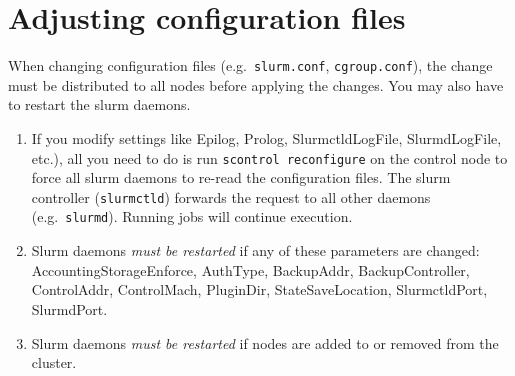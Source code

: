 %
%
%
%
%
%

\section{Adjusting configuration files} \label{sec:slurmconfig}

When changing configuration files (e.g.\ \texttt{slurm.conf}, \texttt{cgroup.conf}), the change must be distributed to all nodes before applying the changes. You may also have to restart the slurm daemons.

\begin{enumerate}
\item If you modify settings like Epilog, Prolog, SlurmctldLogFile, SlurmdLogFile, etc.), all you need to do is run \texttt{scontrol reconfigure} on the control node to force all slurm daemons to re-read the configuration files. The slurm controller (\texttt{slurmctld}) forwards the request to all other daemons (e.g.\ \texttt{slurmd}). Running jobs will continue execution. 
\item Slurm daemons \emph{must be restarted} if any of these parameters are changed: AccountingStorageEnforce, AuthType, BackupAddr, BackupController, ControlAddr, ControlMach, PluginDir, StateSaveLocation, SlurmctldPort, SlurmdPort.
\item Slurm daemons \emph{must be restarted} if nodes are added to or removed from the cluster.
\end{enumerate}


